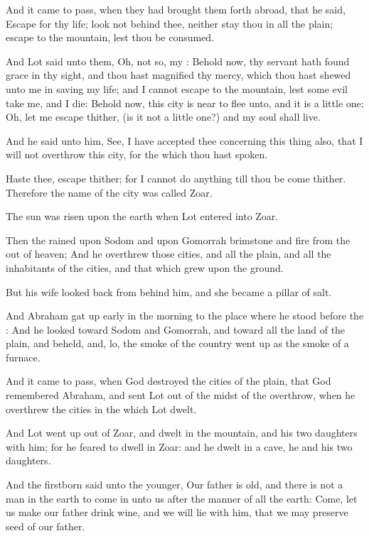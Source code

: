 \Verse And it came to pass, when they had brought them forth abroad, that he said, Escape for thy life; look not behind thee, neither stay thou in all the plain; escape to the mountain, lest thou be consumed.

\Verse And Lot said unto them, Oh, not so, my \LORD: \Verse Behold now, thy servant hath found grace in thy sight, and thou hast magnified thy mercy, which thou hast shewed unto me in saving my life; and I cannot escape to the mountain, lest some evil take me, and I die: \Verse Behold now, this city is near to flee unto, and it is a little one: Oh, let me escape thither, (is it not a little one?) and my soul shall live.

\Verse And he said unto him, See, I have accepted thee concerning this thing also, that I will not overthrow this city, for the which thou hast spoken.

\Verse Haste thee, escape thither; for I cannot do anything till thou be come thither. Therefore the name of the city was called Zoar.

\Verse The sun was risen upon the earth when Lot entered into Zoar.

\Verse Then the \LORD rained upon Sodom and upon Gomorrah brimstone and fire from the \LORD out of heaven; \Verse And he overthrew those cities, and all the plain, and all the inhabitants of the cities, and that which grew upon the ground.

\Verse But his wife looked back from behind him, and she became a pillar of salt.

\Verse And Abraham gat up early in the morning to the place where he stood before the \LORD: \Verse And he looked toward Sodom and Gomorrah, and toward all the land of the plain, and beheld, and, lo, the smoke of the country went up as the smoke of a furnace.

\Verse And it came to pass, when God destroyed the cities of the plain, that God remembered Abraham, and sent Lot out of the midst of the overthrow, when he overthrew the cities in the which Lot dwelt.

\Verse And Lot went up out of Zoar, and dwelt in the mountain, and his two daughters with him; for he feared to dwell in Zoar: and he dwelt in a cave, he and his two daughters.

\Verse And the firstborn said unto the younger, Our father is old, and there is not a man in the earth to come in unto us after the manner of all the earth: \Verse Come, let us make our father drink wine, and we will lie with him, that we may preserve seed of our father.

